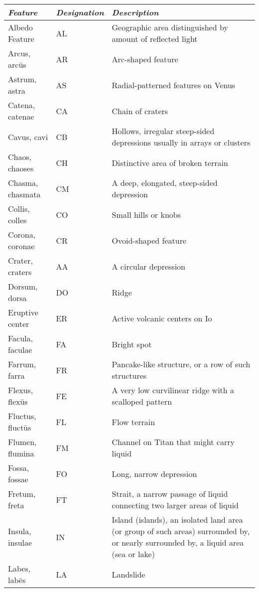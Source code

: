 \begin{longtabu} to \textwidth {l|l|X}\toprule
\emph{Feature}        & \emph{Designation} & \emph{Description}\\\midrule
Albedo Feature        & AL & Geographic area distinguished by amount of reflected light\\\midrule
Arcus, arcūs          & AR & Arc-shaped feature\\\midrule
Astrum, astra         & AS & Radial-patterned features on Venus \\\midrule
Catena, catenae       & CA & Chain of craters \\\midrule
Cavus, cavi           & CB & Hollows, irregular steep-sided depressions usually in arrays or clusters\\\midrule
Chaos, chaoses        & CH & Distinctive area of broken terrain\\\midrule
Chasma, chasmata      & CM & A deep, elongated, steep-sided depression\\\midrule
Collis, colles        & CO & Small hills or knobs\\\midrule
Corona, coronae       & CR & Ovoid-shaped feature\\\midrule   
Crater, craters       & AA & A circular depression\\\midrule
Dorsum, dorsa         & DO & Ridge\\\midrule
Eruptive center       & ER & Active volcanic centers on Io\\\midrule
Facula, faculae       & FA & Bright spot\\\midrule
Farrum, farra         & FR & Pancake-like structure, or a row of such structures\\\midrule
Flexus, flexūs        & FE & A very low curvilinear ridge with a scalloped pattern\\\midrule   
Fluctus, fluctūs      & FL & Flow terrain\\\midrule
Flumen, flumina       & FM & Channel on Titan that might carry liquid\\\midrule
Fossa, fossae         & FO & Long, narrow depression\\\midrule
Fretum, freta         & FT & Strait, a narrow passage of liquid connecting two larger areas of liquid\\\midrule
Insula, insulae       & IN & Island (islands), an isolated land area (or group of such areas) surrounded by, or nearly surrounded by, a liquid area (sea or lake)\\\midrule
Labes, labēs          & LA & Landslide\\\midrule   

\end{longtabu}
